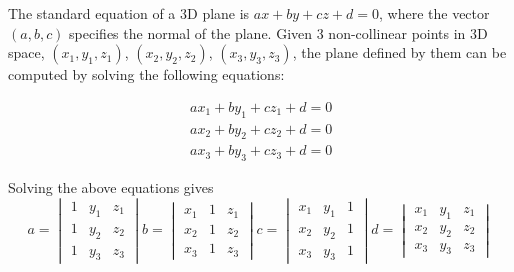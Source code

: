 


\label{sec:plane}

The standard equation of a 3D plane is
$ax + by + cz + d = 0$,
where the vector $(a,b,c)$ specifies the normal of the plane.
Given 3 non-collinear points in 3D space, 
$(x_1, y_1, z_1)$, 
$(x_2, y_2, z_2)$, 
$(x_3, y_3, z_3)$, 
the plane defined by them can be computed by solving the following equations: 

\begin{equation*}
\begin{array}{lr}
\, ax_1 + by_1 + cz_1 + d = 0 \\
\, ax_2 + by_2 + cz_2 + d = 0 \\
\, ax_3 + by_3 + cz_3 + d = 0 
\end{array}
\end{equation*}

Solving the above equations gives
\begin{equation*}
a = \begin{vmatrix} 
1 & y_1 & z_1 \\
1 & y_2 & z_2 \\
1 & y_3 & z_3
\end{vmatrix} 
b = \begin{vmatrix} 
x_1 & 1 & z_1 \\
x_2 & 1 & z_2 \\
x_3 & 1 & z_3
\end{vmatrix}
c = \begin{vmatrix} 
x_1 & y_1 & 1 \\
x_2 & y_2 & 1 \\
x_3 & y_3 & 1
\end{vmatrix}
d = \begin{vmatrix}
x_1 & y_1 & z_1 \\
x_2 & y_2 & z_2 \\
x_3 & y_3 & z_3
\end{vmatrix}
\end{equation*}

